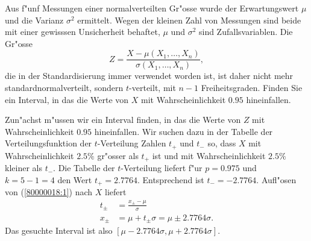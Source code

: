 Aus f"unf Messungen einer normalverteilten Gr"osse wurde der Erwartungswert
$\mu$ und die Varianz $\sigma^2$ ermittelt.
Wegen der kleinen Zahl von Messungen sind beide mit einer gewisssen
Unsicherheit behaftet, $\mu$ und  $\sigma^2$ sind Zufallsvariablen.
Die Gr"osse
\begin{equation}
Z=\frac{X-\mu(X_1,\dots,X_n)}{\sigma(X_1,\dots,X_n)},
\label{80000018:1}
\end{equation}
die in der Standardisierung immer verwendet worden ist, ist daher
nicht mehr standardnormalverteilt, sondern $t$-verteilt, mit $n-1$ 
Freiheitsgraden. Finden Sie ein Interval, in das die Werte von $X$
mit Wahrscheinlichkeit $0.95$ hineinfallen.

\begin{loesung}
Zun"achst m"ussen wir ein Interval finden, in das die Werte von
$Z$ mit Wahrscheinlichkeit $0.95$ hineinfallen. Wir suchen dazu in
der Tabelle der Verteilungsfunktion der $t$-Verteilung Zahlen $t_+$
und $t_-$ so, dass $X$ mit Wahrscheinlichkeit $2.5\%$ gr"osser als $t_+$
ist und mit Wahrscheinlichkeit $2.5\%$ kleiner als $t_-$. Die Tabelle
der $t$-Verteilung liefert f"ur $p=0.975$ und $k=5-1=4$ den Wert
$t_+=2.7764$. Entsprechend ist $t_-=-2.7764$. Aufl"osen von
(\ref{80000018:1}) nach $X$ liefert
\begin{align*}
t_\pm &=\frac{x_{\pm}-\mu}{\sigma}\\
x_\pm&=\mu +t_\pm\sigma = \mu \pm 2.7764\sigma.
\end{align*}
Das gesuchte Interval ist also $[\mu-2.7764\sigma,\mu+2.7764\sigma]$.
\end{loesung}
